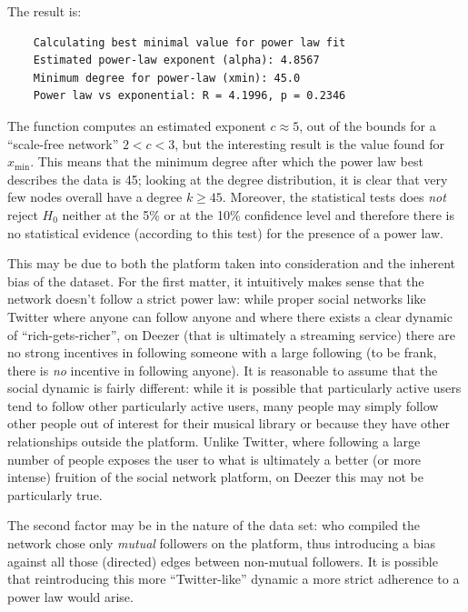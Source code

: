 \documentclass[12pt]{article}
\begin{document}
The result is:
\begin{center}
	\begin{verbatim}
	Calculating best minimal value for power law fit
	Estimated power-law exponent (alpha): 4.8567
	Minimum degree for power-law (xmin): 45.0
	Power law vs exponential: R = 4.1996, p = 0.2346
\end{verbatim}
\end{center}
The function computes an estimated exponent $c\approx 5$, out of the bounds for a ``scale-free network'' $2<c<3$, but the interesting result is the value found for $x_{\min}$. This means that the minimum degree after which the power law best describes the data is 45; looking at the degree distribution, it is clear that very few nodes overall have a degree $k\geq45$. Moreover, the statistical tests does \textit{not} reject $H_{0}$ neither at the 5\% or at the 10\% confidence level and therefore there is no statistical evidence (according to this test) for the presence of a power law.\par
This may be due to both the platform taken into consideration and the inherent bias of the dataset. For the first matter, it intuitively makes sense that the network doesn't follow a strict power law: while proper social networks like Twitter where anyone can follow anyone and where there exists a clear dynamic of ``rich-gets-richer'', on Deezer (that is ultimately a streaming service) there are no strong incentives in following someone with a large following (to be frank, there is \textit{no} incentive in following anyone). It is reasonable to assume that the social dynamic is fairly different: while it is possible that particularly active users tend to follow other particularly active users, many people may simply follow other people out of interest for their musical library or because they have other relationships outside the platform. Unlike Twitter, where following a large number of people exposes the user to what is ultimately a better (or more intense) fruition of the social network platform, on Deezer this may not be particularly true.\par
The second factor may be in the nature of the data set: who compiled the network chose only \textit{mutual} followers on the platform, thus introducing a bias against all those (directed) edges between non-mutual followers. It is possible that reintroducing this more ``Twitter-like'' dynamic a more strict adherence to a power law would arise.
\end{document}

